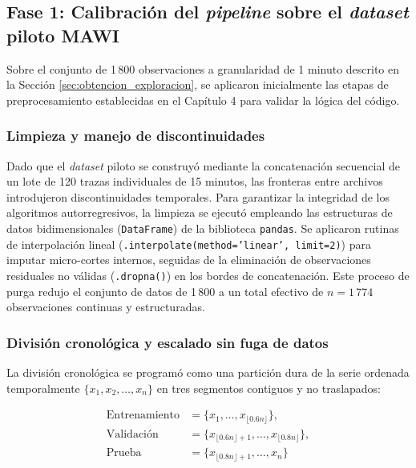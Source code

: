 \documentclass[12pt]{report}
\begin{document}
\subsection*{Fase 1: Calibración del \textit{pipeline} sobre el \textit{dataset} piloto MAWI}

Sobre el conjunto de 1\,800 observaciones a granularidad de 1 minuto descrito en la Sección \ref{sec:obtencion_exploracion}, se aplicaron inicialmente las etapas de preprocesamiento establecidas en el Capítulo 4 para validar la lógica del código.

\subsubsection*{Limpieza y manejo de discontinuidades}

Dado que el \textit{dataset} piloto se construyó mediante la concatenación secuencial de un lote de 120 trazas individuales de 15 minutos, las fronteras entre archivos introdujeron discontinuidades temporales. Para garantizar la integridad de los algoritmos autorregresivos, la limpieza se ejecutó empleando las estructuras de datos bidimensionales 
(\texttt{DataFrame}) de la biblioteca \texttt{pandas}. Se aplicaron rutinas de interpolación lineal (\texttt{.interpolate(method='linear', limit=2)}) para imputar micro-cortes internos, seguidas de la eliminación de observaciones residuales no válidas (\texttt{.dropna()}) en los bordes de concatenación. Este proceso de purga redujo el conjunto de 
datos de 1\,800 a un total efectivo de $n=1\,774$ observaciones continuas y estructuradas.

\subsubsection*{División cronológica y escalado sin fuga de datos}

La división cronológica se programó como una partición dura de la serie ordenada temporalmente $\{x_1, x_2, \dots, x_n\}$ en tres segmentos contiguos y no traslapados:

\begin{equation}
\begin{aligned}
    \text{Entrenamiento} &= \{x_1, \dots, x_{\lfloor 0.6n \rfloor}\}, \\
    \text{Validación} &= \{x_{\lfloor 0.6n \rfloor + 1}, \dots, x_{\lfloor 0.8n \rfloor}\}, \\
    \text{Prueba} &= \{x_{\lfloor 0.8n \rfloor + 1}, \dots, x_n\}
\end{aligned}
\label{eq:split_cronologico}
\end{equation}
\end{document}
